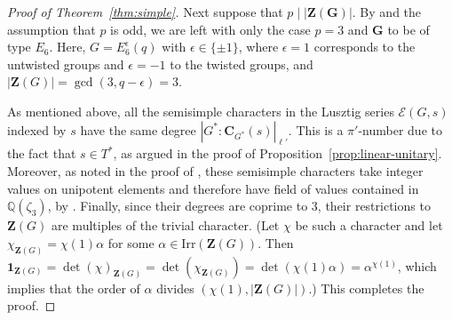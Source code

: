 \documentclass[12pt]{amsart}
\theoremstyle{definition}
\numberwithin{equation}{section}
\newcommand{\Irr}{{\mathrm {Irr}}}
\newcommand{\QQ}{{\mathbb Q}}
\newcommand{\EC}{\mathcal{E}}
\newcommand{\bC}{{\mathbf{C}}}
\newcommand{\bG}{{\mathbf{G}}}
\newcommand{\bZ}{{\mathbf{Z}}}
\begin{document}
\begin{proof}[Proof of Theorem~\ref{thm:simple}]
Next suppose that $p\mid |\bZ(\bG)|$. By
\cite[Theorem~1.12.5]{GLS98} and the assumption that $p$ is odd, we
are left with only the %
case $p=3$ and %
$\bG$ to be of type $E_6$.
Here, $G=E_6^\epsilon(q)$ with $\epsilon\in\{\pm1\}$, where %
$\epsilon=1$ corresponds to the untwisted groups %
and $\epsilon=-1$
to %
the twisted groups, and $|\bZ(G)|=\gcd(3,q-\epsilon)=3$.

As mentioned above, all the semisimple characters in the Lusztig
series $\EC(G,s)$ indexed by $s$ have the same degree
$|G^*:\bC_{G^*}(s)|_{\ell'}$. This is a $\pi'$-number due to the
fact that %
$s\in T^*$, as %
argued in the proof of
Proposition~\ref{prop:linear-unitary}. Moreover, as noted in the
proof of \cite[Proposition~4.5]{GHSV21}, these semisimple characters
take integer values on unipotent elements and therefore have field
of values contained in $\QQ(\zeta_3)$, by \cite[Lemma~4.3]{GHSV21}.
Finally, since their degrees are coprime to $3$, their restrictions
to $\bZ(G)$ are %
multiples of the trivial character. (Let $\chi$ be
such a character and %
let $\chi_{\bZ(G)}=\chi(1)\alpha$ for %
some
$\alpha\in\Irr(\bZ(G))$. %
Then
$\mathbf{1}_{\bZ(G)}=\det(\chi)_{\bZ(G)}=\det(\chi_{\bZ(G)})=\det(\chi(1)\alpha)=\alpha^{\chi(1)}$,
which %
implies that the order of $\alpha$ divides
$(\chi(1),|\bZ(G)|)$.) This completes the proof.
\end{proof}
\end{document}
